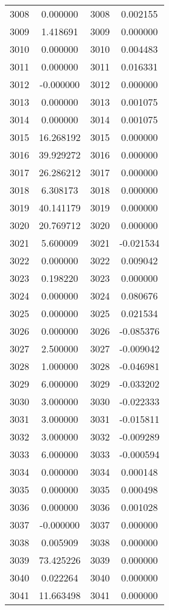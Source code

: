 \documentclass[12pt]{article}
\begin{document}
\begin{longtable}{@{}cccc@{}}
3008 & 0.000000 & 3008 & 0.002155 \\
3009 & 1.418691 & 3009 & 0.000000 \\
3010 & 0.000000 & 3010 & 0.004483 \\
3011 & 0.000000 & 3011 & 0.016331 \\
3012 & -0.000000 & 3012 & 0.000000 \\
3013 & 0.000000 & 3013 & 0.001075 \\
3014 & 0.000000 & 3014 & 0.001075 \\
3015 & 16.268192 & 3015 & 0.000000 \\
3016 & 39.929272 & 3016 & 0.000000 \\
3017 & 26.286212 & 3017 & 0.000000 \\
3018 & 6.308173 & 3018 & 0.000000 \\
3019 & 40.141179 & 3019 & 0.000000 \\
3020 & 20.769712 & 3020 & 0.000000 \\
3021 & 5.600009 & 3021 & -0.021534 \\
3022 & 0.000000 & 3022 & 0.009042 \\
3023 & 0.198220 & 3023 & 0.000000 \\
3024 & 0.000000 & 3024 & 0.080676 \\
3025 & 0.000000 & 3025 & 0.021534 \\
3026 & 0.000000 & 3026 & -0.085376 \\
3027 & 2.500000 & 3027 & -0.009042 \\
3028 & 1.000000 & 3028 & -0.046981 \\
3029 & 6.000000 & 3029 & -0.033202 \\
3030 & 3.000000 & 3030 & -0.022333 \\
3031 & 3.000000 & 3031 & -0.015811 \\
3032 & 3.000000 & 3032 & -0.009289 \\
3033 & 6.000000 & 3033 & -0.000594 \\
3034 & 0.000000 & 3034 & 0.000148 \\
3035 & 0.000000 & 3035 & 0.000498 \\
3036 & 0.000000 & 3036 & 0.001028 \\
3037 & -0.000000 & 3037 & 0.000000 \\
3038 & 0.005909 & 3038 & 0.000000 \\
3039 & 73.425226 & 3039 & 0.000000 \\
3040 & 0.022264 & 3040 & 0.000000 \\
3041 & 11.663498 & 3041 & 0.000000 \\

\end{longtable}
\end{document}
